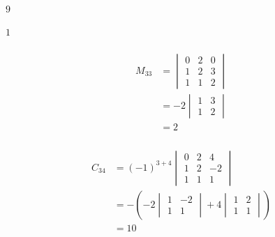 \documentclass{article}
\begin{document}
$9$

\setcounter{subsubsection}{2}
\subsubsection{}

$1$

\setcounter{subsubsection}{4}
\subsubsection{}

\begin{align*}
  M_{33} & = \begin{vmatrix}
               0 & 2 & 0 \\
               1 & 2 & 3 \\
               1 & 1 & 2
             \end{vmatrix}    \\
         & = -2 \begin{vmatrix}
                  1 & 3 \\
                  1 & 2
                \end{vmatrix} \\
         & = 2
\end{align*}

\setcounter{subsubsection}{6}
\subsubsection{}

\begin{align*}
  C_{34} & = (-1)^{3 + 4} \begin{vmatrix}
                            0 & 2 & 4  \\
                            1 & 2 & -2 \\
                            1 & 1 & 1
                          \end{vmatrix}                        \\
         & = -\left( -2 \begin{vmatrix}
                            1 & -2 \\
                            1 & 1
                          \end{vmatrix} + 4 \begin{vmatrix}
                                              1 & 2 \\
                                              1 & 1
                                            \end{vmatrix} \right) \\
         & = 10
\end{align*}
\end{document}
